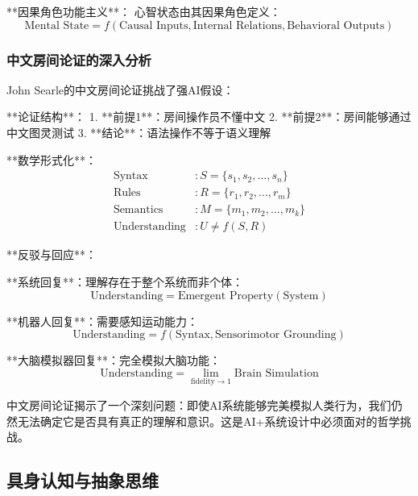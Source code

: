 **因果角色功能主义**：
心智状态由其因果角色定义：
\begin{equation}
\text{Mental State} = f(\text{Causal Inputs}, \text{Internal Relations}, \text{Behavioral Outputs})
\end{equation}

\subsubsection{中文房间论证的深入分析} %

John Searle的中文房间论证挑战了强AI假设：

**论证结构**：
1. **前提1**：房间操作员不懂中文
2. **前提2**：房间能够通过中文图灵测试
3. **结论**：语法操作不等于语义理解

**数学形式化**：
\begin{align}
\text{Syntax} &: S = \{s_1, s_2, ..., s_n\} \\
\text{Rules} &: R = \{r_1, r_2, ..., r_m\} \\
\text{Semantics} &: M = \{m_1, m_2, ..., m_k\} \\
\text{Understanding} &: U \neq f(S, R)
\end{align}

**反驳与回应**：

**系统回复**：理解存在于整个系统而非个体：
\begin{equation}
\text{Understanding} = \text{Emergent Property}(\text{System})
\end{equation}

**机器人回复**：需要感知运动能力：
\begin{equation}
\text{Understanding} = f(\text{Syntax}, \text{Sensorimotor Grounding})
\end{equation}

**大脑模拟器回复**：完全模拟大脑功能：
\begin{equation}
\text{Understanding} = \lim_{\text{fidelity} \to 1} \text{Brain Simulation}
\end{equation}

\begin{center}
中文房间论证揭示了一个深刻问题：即使AI系统能够完美模拟人类行为，我们仍然无法确定它是否具有真正的理解和意识。这是AI+系统设计中必须面对的哲学挑战。
\end{center}

\subsection{具身认知与抽象思维}

